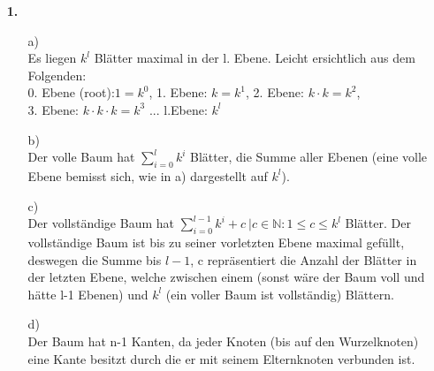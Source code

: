 \documentclass[a4paper,11pt,fleqn]{scrartcl}
\title{\titleinfo}
\author{\authorinfo}
\begin{document}
	\maketitle
	\begin{enumerate}
		\item[\textbf{1.}]
		\begin{enumerate}
			\item[a)]\quad \\
				Es liegen \(k^l\) Blätter maximal in der l. Ebene. Leicht ersichtlich aus dem Folgenden: \\
				0. Ebene (root):\(1 = k^0\), 1. Ebene: \(k = k^1\), 2. Ebene: \(k\cdot k = k^2\),\\
				3. Ebene: \(k\cdot k \cdot k = k^3\) ... l.Ebene: \(k^l\)
			\item[b)]\quad \\
				Der volle Baum hat \(\sum\limits_{i=0}^lk^i\) Blätter, die Summe aller Ebenen (eine volle Ebene 
				bemisst sich, wie in a) dargestellt auf \(k^l\)).
			\item[c)]\quad \\
				Der vollständige Baum hat \(\sum\limits_{i=0}^{l-1}k^i +c\ |c\in\mathbb{N}:1\leq c\leq k^l\)
				Blätter. Der vollständige Baum ist bis zu seiner vorletzten Ebene maximal gefüllt, deswegen die 
				Summe bis $l-1$, c repräsentiert die Anzahl der Blätter in der letzten Ebene, welche zwischen 
				einem (sonst wäre der Baum voll und hätte l-1 Ebenen) und $k^l$ (ein voller Baum ist 
				vollständig) Blättern.
			\item[d)]\quad \\
				Der Baum hat n-1 Kanten, da jeder Knoten (bis auf den Wurzelknoten) eine Kante besitzt durch 
				die er mit seinem Elternknoten verbunden ist.
		\end{enumerate}
		

\end{enumerate}
\end{document}
